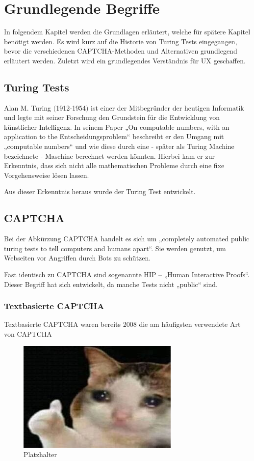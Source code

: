 \chapter{Grundlegende Begriffe}
\label{ch:basics}
In folgendem Kapitel werden die Grundlagen erläutert, welche für spätere Kapitel benötigt werden. 
Es wird kurz auf die Historie von Turing Tests eingegangen, 
bevor die verschiedenen CAPTCHA-Methoden und Alternativen grundlegend erläutert werden. 
Zuletzt wird ein grundlegendes Verständnis für UX geschaffen.

\section{Turing Tests}
\label{ch:basics:turing}
Alan M. Turing $($1912-1954$)$ ist einer der Mitbegründer der heutigen Informatik 
und legte mit seiner Forschung den Grundstein für die Entwicklung von künstlicher Intelligenz. 
In seinem Paper „On computable numbers, with an application to the Entscheidungsproblem“ \cite{turing} 
beschreibt er den Umgang mit „computable numbers“ und wie diese durch eine - später als Turing Machine bezeichnete - Maschine berechnet werden könnten. 
Hierbei kam er zur Erkenntnis, dass sich nicht alle mathematischen Probleme durch eine fixe Vorgehensweise lösen lassen. \cite[p.647]{geniusofturing} 

Aus dieser Erkenntnis heraus wurde der Turing Test entwickelt. 

\section{CAPTCHA}
Bei der Abkürzung CAPTCHA handelt es sich um „completely automated public turing tests to tell computers and humans apart“. 
Sie werden genutzt, um Webseiten vor Angriffen durch Bots zu schützen. 

Fast identisch zu CAPTCHA sind sogenannte HIP – „Human Interactive Proofs“. 
Dieser Begriff hat sich entwickelt, da manche Tests nicht „public“ sind. \cite[p.1]{chellapilla} \cite{tutorial} 


\subsection{Textbasierte CAPTCHA}

Textbasierte CAPTCHA waren bereits 2008 die am häufigsten verwendete Art von CAPTCHA 

\begin{figure}
    \centering
    \includegraphics{gfx/mygraphics/platzhalter.png}
    \caption{Platzhalter}
    \label{fig:platzhalter}
\end{figure}

